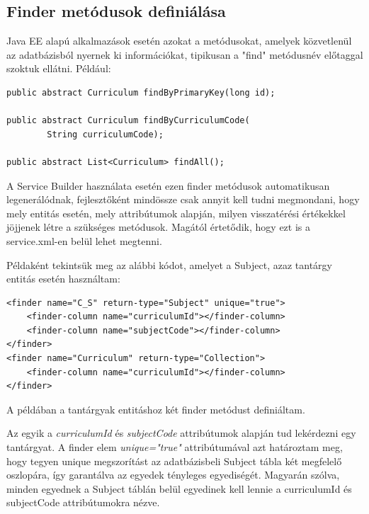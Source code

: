 \documentclass[hidelinks, 12pt, a4paper]{report}
\begin{document}
\subsection{Finder metódusok definiálása}

Java EE alapú alkalmazások esetén azokat a metódusokat, amelyek közvetlenül az adatbázisból nyernek ki információkat, tipikusan a "find" metódusnév előtaggal szoktuk ellátni. Például:

\begin{minipage}{\linewidth}
\begin{lstlisting}
public abstract Curriculum findByPrimaryKey(long id);

public abstract Curriculum findByCurriculumCode(
		String curriculumCode);

public abstract List<Curriculum> findAll();
\end{lstlisting}
\end{minipage}

A Service Builder használata esetén ezen finder metódusok automatikusan legenerálódnak, fejlesztőként mindössze csak annyit kell tudni megmondani, hogy mely entitás esetén, mely attribútumok alapján, milyen visszatérési értékekkel jöjjenek létre a szükséges metódusok. Magától értetődik, hogy ezt is a service.xml-en belül lehet megtenni.

Példaként tekintsük meg az alábbi kódot, amelyet a Subject, azaz tantárgy entitás esetén használtam:

\begin{minipage}{\linewidth}
\begin{lstlisting}
<finder name="C_S" return-type="Subject" unique="true">
	<finder-column name="curriculumId"></finder-column>
	<finder-column name="subjectCode"></finder-column>
</finder>
<finder name="Curriculum" return-type="Collection">
	<finder-column name="curriculumId"></finder-column>
</finder>
\end{lstlisting}
\end{minipage}

A példában a tantárgyak entitáshoz két finder metódust definiáltam.

Az egyik a \emph{curriculumId} és \emph{subjectCode} attribútumok alapján tud lekérdezni egy tantárgyat. A finder elem \emph{unique="true"} attribútumával azt határoztam meg, hogy tegyen unique megszorítást az adatbázisbeli Subject tábla két megfelelő oszlopára, így garantálva az egyedek tényleges egyediségét. Magyarán szólva, minden egyednek a Subject táblán belül egyedinek kell lennie a curriculumId és subjectCode attribútumokra nézve.
\end{document}
